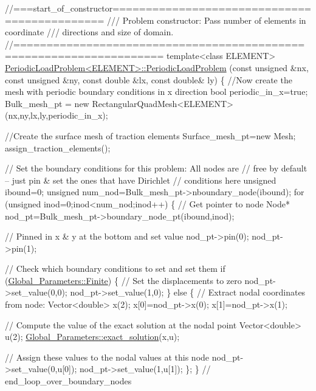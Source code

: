 \begin{DoxyCodeInclude}
\textcolor{comment}{//===start\_of\_constructor=============================================}
\textcolor{comment}{/// Problem constructor: Pass number of elements in coordinate}
\textcolor{comment}{}\textcolor{comment}{/// directions and size of domain.}
\textcolor{comment}{}\textcolor{comment}{//====================================================================}
\textcolor{keyword}{template}<\textcolor{keyword}{class} ELEMENT>
\hyperlink{classPeriodicLoadProblem_a66bf36608f2068374c09c73d9256edda}{PeriodicLoadProblem<ELEMENT>::PeriodicLoadProblem}
(\textcolor{keyword}{const} \textcolor{keywordtype}{unsigned} &nx, \textcolor{keyword}{const} \textcolor{keywordtype}{unsigned} &ny,
 \textcolor{keyword}{const} \textcolor{keywordtype}{double} &lx, \textcolor{keyword}{const} \textcolor{keywordtype}{double}& ly)
\{
 \textcolor{comment}{//Now create the mesh with periodic boundary conditions in x direction}
 \textcolor{keywordtype}{bool} periodic\_in\_x=\textcolor{keyword}{true};
 Bulk\_mesh\_pt = 
  \textcolor{keyword}{new} RectangularQuadMesh<ELEMENT>(nx,ny,lx,ly,periodic\_in\_x);

 \textcolor{comment}{//Create the surface mesh of traction elements}
 Surface\_mesh\_pt=\textcolor{keyword}{new} Mesh;
 assign\_traction\_elements();

 \textcolor{comment}{// Set the boundary conditions for this problem: All nodes are}
 \textcolor{comment}{// free by default -- just pin & set the ones that have Dirichlet }
 \textcolor{comment}{// conditions here}
 \textcolor{keywordtype}{unsigned} ibound=0;
 \textcolor{keywordtype}{unsigned} num\_nod=Bulk\_mesh\_pt->nboundary\_node(ibound);
 \textcolor{keywordflow}{for} (\textcolor{keywordtype}{unsigned} inod=0;inod<num\_nod;inod++)
  \{
   \textcolor{comment}{// Get pointer to node}
   Node* nod\_pt=Bulk\_mesh\_pt->boundary\_node\_pt(ibound,inod);

   \textcolor{comment}{// Pinned in x & y at the bottom and set value}
   nod\_pt->pin(0);
   nod\_pt->pin(1);

   \textcolor{comment}{// Check which boundary conditions to set and set them}
   \textcolor{keywordflow}{if} (\hyperlink{namespaceGlobal__Parameters_a3a5d4759509036a2650d5efde8e15d56}{Global\_Parameters::Finite})
     \{
      \textcolor{comment}{// Set the displacements to zero}
      nod\_pt->set\_value(0,0);
      nod\_pt->set\_value(1,0);
     \}
   \textcolor{keywordflow}{else}
     \{
      \textcolor{comment}{// Extract nodal coordinates from node:}
      Vector<double> x(2);
      x[0]=nod\_pt->x(0);
      x[1]=nod\_pt->x(1);

      \textcolor{comment}{// Compute the value of the exact solution at the nodal point}
      Vector<double> u(2);
      \hyperlink{namespaceGlobal__Parameters_a6e53a9e4370e8719e9091eff6b6a0c01}{Global\_Parameters::exact\_solution}(x,u);

      \textcolor{comment}{// Assign these values to the nodal values at this node}
      nod\_pt->set\_value(0,u[0]);
      nod\_pt->set\_value(1,u[1]);
     \};
  \} \textcolor{comment}{// end\_loop\_over\_boundary\_nodes}

\end{DoxyCodeInclude}


